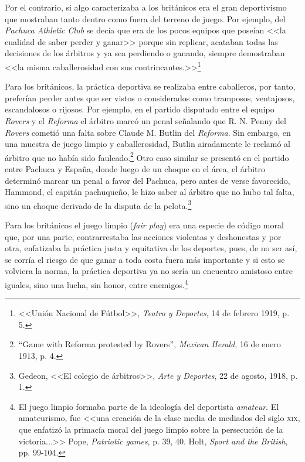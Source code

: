 \documentclass[11pt,a5paper,twoside]{book} %
\begin{document}
Por el contrario, si algo caracterizaba a los británicos era el gran deportivismo que mostraban tanto dentro como fuera del terreno de juego. Por ejemplo, del \emph{Pachuca Athletic Club} se decía que era de los pocos equipos que poseían <<la cualidad de saber perder y ganar>> porque sin replicar, acataban todas las decisiones de los árbitros y ya sea perdiendo o ganando, siempre demostraban <<la misma caballerosidad con sus contrincantes.>>\footnote{<<Unión Nacional de Fútbol>>, \emph{Teatro y Deportes}, 14 de febrero 1919, p. 5.}

Para los británicos, la práctica deportiva se realizaba entre caballeros, por tanto, preferían perder antes que ser vistos o considerados como tramposos, ventajosos, escandalosos o rijosos. Por ejemplo, en el partido disputado entre el equipo \emph{Rovers} y el \emph{Reforma} el árbitro marcó un penal señalando que R. N. Penny del \emph{Rovers} cometió una falta sobre Claude M. Butlin del \emph{Reforma}. Sin embargo, en una muestra de juego limpio y caballerosidad, Butlin airadamente le reclamó al árbitro que no había sido fauleado.\footnote{``Game with Reforma protested by Rovers'', \emph{Mexican Herald}, 16 de enero 1913, p. 4.} Otro caso similar se presentó en el partido entre Pachuca y España, donde luego de un choque en el área, el árbitro determinó marcar un penal a favor del Pachuca, pero antes de verse favorecido, Hammond, el capitán pachuqueño, le hizo saber al árbitro que no hubo tal falta, sino un choque derivado de la disputa de la pelota.\footnote{Gedeon, <<El colegio de árbitros>>, \emph{Arte y Deportes}, 22 de agosto, 1918, p. 1.}

Para los británicos el juego limpio (\emph{fair play}) era una especie de código moral que, por una parte, contrarrestaba las acciones violentas y deshonestas y por otra, enfatizaba la práctica justa y equitativa de los deportes, pues, de no ser así, se corría el riesgo de que ganar a toda costa fuera más importante y si esto se volviera la norma, la práctica deportiva ya no sería un encuentro amistoso entre iguales, sino una lucha, sin honor, entre enemigos.\footnote{El juego limpio formaba parte de la ideología del deportista \emph{amateur}. El amateurismo, fue <<una creación de la clase media de mediados del siglo \textsc{xix}, que enfatizó la primacía moral del juego limpio sobre la persecución de la victoria...>> Pope, \emph{Patriotic games}, p. 39, 40. Holt, \emph{Sport and the British}, pp. 99-104.}
\end{document}
